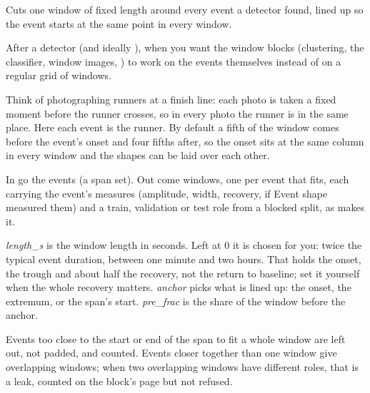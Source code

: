 Cuts one window of fixed length around every event a detector found, lined up so the event
starts at the same point in every window.

After a detector (and ideally ), when you want the window
blocks (clustering, the classifier, window images, ) to work
on the events themselves instead of on a regular grid of windows.

\begin{plainterms}
Think of photographing runners at a finish line: each photo is taken a fixed moment before the
runner crosses, so in every photo the runner is in the same place. Here each event is the
runner. By default a fifth of the window comes before the event's onset and four fifths after,
so the onset sits at the same column in every window and the shapes can be laid over each
other.
\end{plainterms}

In go the events (a span set). Out come windows, one per event that fits, each carrying the
event's measures (amplitude, width, recovery, if Event shape measured them) and a train,
validation or test role from a blocked split, as 
makes it.

\emph{length\_s} is the window length in seconds. Left at 0 it is chosen for you: twice the
typical event duration, between one minute and two hours. That holds the onset, the trough and
about half the recovery, not the return to baseline; set it yourself when the whole recovery
matters. \emph{anchor} picks what is lined up: the onset, the extremum, or the span's start.
\emph{pre\_frac} is the share of the window before the anchor.

Events too close to the start or end of the span to fit a whole window are left out, not
padded, and counted. Events closer together than one window give overlapping windows; when two
overlapping windows have different roles, that is a leak, counted on the block's page but not
refused.
